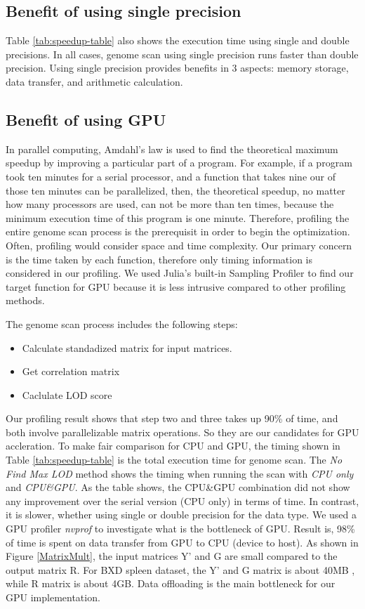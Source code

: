 \documentclass[9pt,twocolumn,twoside,lineno]{gsag3jnl}
\begin{document}
\subsection{Benefit of using single precision}
Table \ref{tab:speedup-table} also shows the execution time using single and double precisions. 
In all cases, genome scan using single precision runs faster than double precision. 
Using single precision provides benefits in 3 aspects: memory storage, data transfer, and arithmetic calculation. 

\subsection{Benefit of using GPU}
In parallel computing, Amdahl's law is used to find the theoretical maximum speedup by improving a particular part of a program.  
For example, if a program took ten minutes for a serial processor, and a function that takes nine our of those ten minutes can be parallelized, then, the theoretical speedup, no matter how many processors are used, can not be more than ten times, because the minimum execution time of this program is one minute. 
Therefore, profiling the entire genome scan process is the prerequisit in order to begin the optimization. 
Often, profiling would consider space and time complexity. 
Our primary concern is the time taken by each function, therefore only timing information is considered in our profiling. 
We used Julia's built-in Sampling Profiler to find our target function for GPU because it is less intrusive compared to other profiling methods. 

The genome scan process includes the following steps:
\begin{itemize}
	\item Calculate standadized matrix for input matrices.
	\item Get correlation matrix
	\item Caclulate LOD score
\end{itemize}
Our profiling result shows that step two and three takes up 90\% of time, and both involve parallelizable matrix operations. 
So they are our candidates for GPU accleration.
To make fair comparison for CPU and GPU, the timing shown in Table \ref{tab:speedup-table} is the total execution time for genome scan. 
The \textit{No Find Max LOD} method shows the timing when running the scan with \textit{CPU only} and \textit{CPU\&GPU}.
As the table shows, the CPU\&GPU combination did not show any improvement over the serial version (CPU only) in terms of time. 
In contrast, it is slower, whether using single or double precision for the data type.
We used a GPU profiler \textit{nvprof} \cite{nvprof}
to investigate what is the bottleneck of GPU. 
Result is, 98\% of time is spent on data transfer from GPU to CPU (device to host).
As shown in Figure \ref{MatrixMult}, the input matrices Y' and G are small compared to the output matrix R.
For BXD spleen dataset, the Y' and G matrix is about 40MB %
, while R matrix is about 4GB. 
Data offloading is the main bottleneck for our GPU implementation. 
\end{document}
